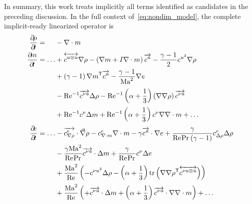 In summary, this work treats implicitly all terms identified as candidates
in the preceding discussion.  In the full context of~\eqref{eq:nondim_model},
the complete implicit-ready linearized operator is
\begin{subequations}
\begin{align}
  \frac{\partial\!\rho}{\partial\!t} = \phantom{\dots} &-\nabla\cdot{}m
\\
  \frac{\partial\!m}{\partial\!t} = \dots
   &+ \overleftrightarrow{c^{u\otimes{}u}} \nabla\rho
    - \left(\nabla{}m+I\nabla\cdot{}m\right)\overrightarrow{c^u}
    - \frac{\gamma-1}{2} c^{u^2} \nabla\rho
\notag\\
   &+ \left(\gamma-1\right){\nabla{}m}^{\mathsf{T}} \overrightarrow{c^u}
    - \frac{\gamma-1}{\mbox{Ma}_{}^2}\nabla{}e
\notag\\
   &- \mbox{Re}_{}^{-1} \overrightarrow{c^{\nu{}u}} \Delta\rho
    - \mbox{Re}_{}^{-1} \left(\alpha+\frac{1}{3}\right) \left(\nabla\nabla\rho\right) \overrightarrow{c^{\nu{}u}}
\notag\\
   &+ \mbox{Re}_{}^{-1} c^{\nu} \Delta{}m
    + \mbox{Re}_{}^{-1} \left(\alpha+\frac{1}{3}\right)c^{\nu} \nabla\nabla\cdot{}m
    + \dots
\\
  \frac{\partial\!e}{\partial\!t} = \dots
   &- \overrightarrow{c^{e}_{\nabla\rho}} \cdot\vec{\nabla}\rho
    - c^{e}_{\nabla\cdot{}m} \nabla\cdot{}m
    - \gamma \overrightarrow{c^u}\cdot\nabla{}e
    + \frac{\gamma}{\mbox{Re}_{}\mbox{Pr}_{}\left(\gamma-1\right)}
      c^{e}_{\Delta\rho} \Delta\rho
\notag\\
   &- \frac{\gamma\mbox{Ma}_{}^{2}}{\mbox{Re}_{}\mbox{Pr}_{}}
      \overrightarrow{c^{\nu{}u}}\cdot\Delta{}m
    + \frac{\gamma}{\mbox{Re}_{}\mbox{Pr}_{}}c^{\nu}\Delta{}e
\notag\\
   &+ \frac{\mbox{Ma}_{}^2}{\mbox{Re}_{}}\left(
       - c^{\nu{}u^2}\Delta\rho
       - \left(\alpha+\frac{1}{3}\right)
         \operatorname{tr}\left({\nabla\nabla\rho}^{\mathsf{T}}
                     \overleftrightarrow{c^{\nu{}u\otimes{}u}}\right)
   \right)
\notag\\
   &+ \frac{\mbox{Ma}_{}^2}{\mbox{Re}_{}}\left(
       + \overrightarrow{c^{\nu{}u}}\cdot\Delta{}m
       + \left(\alpha+\frac{1}{3}\right)
         \overrightarrow{c^{\nu{}u}}\cdot\nabla\nabla\cdot{}m
   \right)
    + \dots
\end{align}
\end{subequations}
